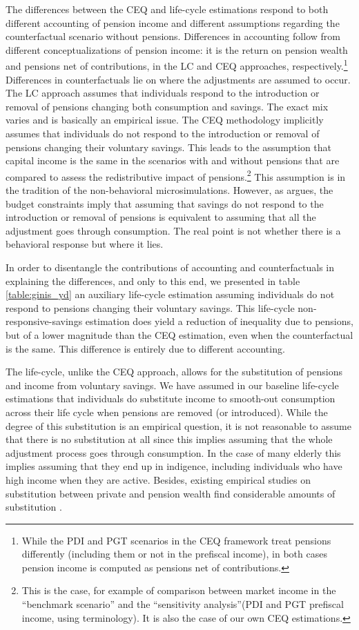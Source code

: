 \documentclass{article}
\begin{document}
The differences between the CEQ and life-cycle estimations respond to both different accounting of pension income and different assumptions regarding the counterfactual scenario without pensions. Differences in accounting follow from different conceptualizations of pension income: it is the return on pension wealth and pensions net of contributions, in the LC and CEQ approaches, respectively.\footnote{While the PDI and PGT scenarios in the CEQ framework treat pensions differently (including them or not in the prefiscal income), in both cases pension income is computed as pensions net of contributions.} Differences in counterfactuals lie on where the adjustments are assumed to occur. The LC approach assumes that individuals respond to the introduction or removal of pensions changing both consumption and savings. The exact mix varies and is basically an empirical issue. The CEQ methodology implicitly assumes that individuals do not respond to the introduction or removal of pensions changing their voluntary savings. This leads to the assumption that capital income is the same in the scenarios with and without pensions that are compared to assess the redistributive impact of pensions.\footnote{This is the case, for example of \textcite{bucheli2014} comparison between market income in the ``benchmark scenario'' and the ``sensitivity analysis''(PDI and PGT prefiscal income, using \textcite{Lustig2022a} terminology). It is also the case of our own CEQ estimations.} This assumption is in the tradition of the non-behavioral microsimulations. However, as \textcite{Forteza2023} argues, the budget constraints imply that assuming that savings do not respond to the introduction or removal of pensions is equivalent to assuming that all the adjustment goes through consumption. The real point is not whether there is a behavioral response but where it lies. 

In order to disentangle the contributions of accounting and counterfactuals in explaining the differences, and only to this end, we presented in table \ref{table:ginis_yd} an auxiliary life-cycle estimation assuming individuals do not respond to pensions changing their voluntary savings.  This life-cycle non-responsive-savings estimation does yield a reduction of inequality due to pensions, but of a lower magnitude than the CEQ estimation, even when the counterfactual is the same. This difference is entirely due to different accounting.  

The life-cycle, unlike the CEQ approach, allows for the substitution of pensions and income from voluntary savings. We have assumed in our baseline life-cycle estimations that individuals do substitute income to smooth-out consumption across their life cycle when pensions are removed (or introduced). While the degree of this substitution is an empirical question, it is not reasonable to assume that there is no substitution at all since this implies assuming that the whole adjustment process goes through consumption. In the case of many elderly this implies assuming that they end up in indigence, including individuals who have high income when they are active. Besides, existing empirical studies on substitution between private and pension wealth find considerable amounts of substitution \parencite{Attanasio2003a, Attanasio2003b, Gale1998}.   
\end{document}
